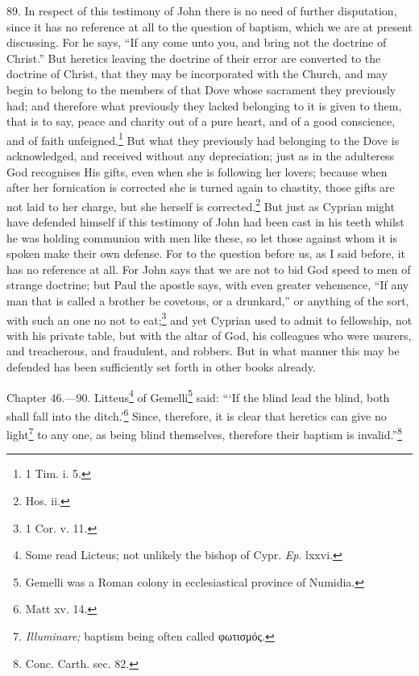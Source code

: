 89. In respect of this testimony of John there is no need of further disputation, since it has no reference at all to the question of baptism, which we are at present discussing. For he says, ``If any come unto you, and bring not the doctrine of Christ.'' But heretics leaving the doctrine of their error are converted to the doctrine of Christ, that they may be incorporated with the Church, and may begin to belong to the members of that Dove whose sacrament they previously had; and therefore what previously they lacked belonging to it is given to them, that is to say, peace and charity out of a pure heart, and of a good conscience, and of faith unfeigned.\footnote{\par  1 Tim. i. 5.} But what they previously had belonging to the Dove is acknowledged, and received without any depreciation; just as in the adulteress God recognises His gifts, even when she is following her lovers; because when after her fornication is corrected she is turned again to chastity, those gifts are not laid to her charge, but she herself is corrected.\footnote{\par  Hos. ii.} But just as Cyprian might have defended himself if this testimony of John had been cast in his teeth whilst he was holding communion with men like these, so let those against whom it is spoken make their own defense. For to the question before us, as I said before, it has no reference at all. For John says that we are not to bid God speed to men of strange doctrine; but Paul the apostle says, with even greater vehemence, ``If any man that is called a brother be covetous, or a drunkard,'' or anything of the sort, with such an one no not to eat;\footnote{\par  1 Cor. v. 11.} and yet Cyprian used to admit to fellowship, not with his private table, but with the altar of God, his colleagues who were usurers, and treacherous, and fraudulent, and robbers. But in what manner this may be defended has been sufficiently set forth in other books already.


Chapter 46.—90. Litteus\footnote{\par  Some read Licteus; not unlikely the bishop of Cypr. \emph{Ep}. lxxvi.} of Gemelli\footnote{\par  Gemelli was a Roman colony in ecclesiastical province of Numidia.} said: ``‘If the blind lead the blind, both shall fall into the ditch.’\footnote{\par  Matt xv. 14.} Since, therefore, it is clear that heretics can give no light\footnote{\par  \emph{Illuminare;} baptism being often called \textgreek{φωτισμός}.} to any one, as being blind themselves, therefore their baptism is invalid.''\footnote{\par  Conc. Carth. sec. 82.}

